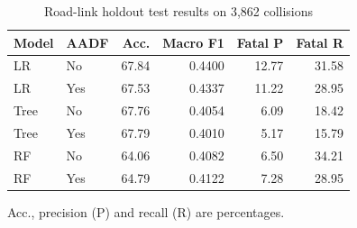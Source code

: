 \begin{table}[t]
\caption{Road-link holdout test results on 3,862 collisions}
\label{tab:grouped}
\centering\small
\begin{tabular}{llrrrr}
\toprule
Model & AADF & Acc. & Macro F1 & Fatal P & Fatal R\\
\midrule
LR & No & 67.84 & 0.4400 & 12.77 & 31.58\\
LR & Yes & 67.53 & 0.4337 & 11.22 & 28.95\\
Tree & No & 67.76 & 0.4054 & 6.09 & 18.42\\
Tree & Yes & 67.79 & 0.4010 & 5.17 & 15.79\\
RF & No & 64.06 & 0.4082 & 6.50 & 34.21\\
RF & Yes & 64.79 & 0.4122 & 7.28 & 28.95\\
\bottomrule
\end{tabular}
\par\vspace{3pt}\footnotesize Acc., precision (P) and recall (R) are percentages.
\end{table}
